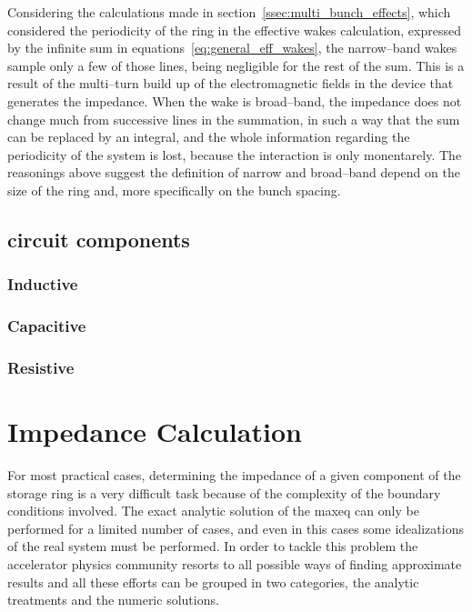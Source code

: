     Considering the calculations made in section~\ref{ssec:multi_bunch_effects}, which considered the periodicity of the ring in the effective wakes calculation, expressed by the infinite sum in equations~\eqref{eq:general_eff_wakes}, the narrow--band wakes sample only a few of those lines, being negligible for the rest of the sum. This is a result of the multi--turn build up of the electromagnetic fields in the device that generates the impedance. When the wake is broad--band, the impedance does not change much from successive lines in the summation, in such a way that the sum can be replaced by an integral, and the whole information regarding the periodicity of the system is lost, because the interaction is only monentarely. The reasonings above suggest the definition of narrow and broad--band depend on the size of the ring and, more specifically on the bunch spacing.


\subsection{circuit components}
\subsubsection{Inductive}
\subsubsection{Capacitive}
\subsubsection{Resistive}

\section{Impedance Calculation}

    For most practical cases, determining the impedance of a given component of the storage ring is a very difficult task because of the complexity of the boundary conditions involved. The exact analytic solution of the \gls{maxeq} can only be performed for a limited number of cases, and even in this cases some idealizations of the real system must be performed. In order to tackle this problem the accelerator physics community resorts to all possible ways of finding approximate results and all these efforts can be grouped in two categories, the analytic treatments and the numeric solutions.

